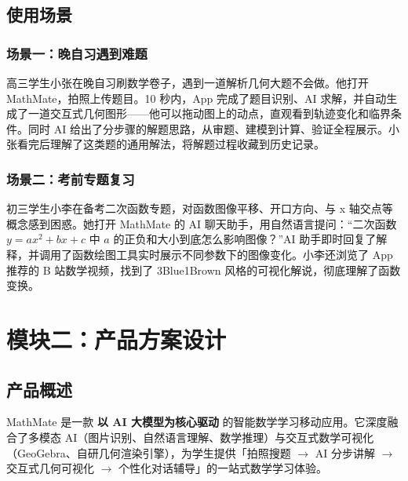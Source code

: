 \documentclass[12pt, a4paper]{ctexart}
\begin{document}
\subsection{使用场景}
\subsubsection{场景一：晚自习遇到难题}
高三学生小张在晚自习刷数学卷子，遇到一道解析几何大题不会做。他打开 MathMate，拍照上传题目。10 秒内，App 完成了题目识别、AI 求解，并自动生成了一道交互式几何图形——他可以拖动图上的动点，直观看到轨迹变化和临界条件。同时 AI 给出了分步骤的解题思路，从审题、建模到计算、验证全程展示。小张看完后理解了这类题的通用解法，将解题过程收藏到历史记录。

\subsubsection{场景二：考前专题复习}
初三学生小李在备考二次函数专题，对函数图像平移、开口方向、与 x 轴交点等概念感到困惑。她打开 MathMate 的 AI 聊天助手，用自然语言提问：“二次函数 $y=ax^2+bx+c$ 中 $a$ 的正负和大小到底怎么影响图像？”AI 助手即时回复了解释，并调用了函数绘图工具实时展示不同参数下的图像变化。小李还浏览了 App 推荐的 B 站数学视频，找到了 3Blue1Brown 风格的可视化解说，彻底理解了函数变换。

\section{模块二：产品方案设计}

\subsection{产品概述}
MathMate 是一款 \textbf{以 AI 大模型为核心驱动} 的智能数学学习移动应用。它深度融合了多模态 AI（图片识别、自然语言理解、数学推理）与交互式数学可视化（GeoGebra、自研几何渲染引擎），为学生提供「拍照搜题 $\rightarrow$ AI 分步讲解 $\rightarrow$ 交互式几何可视化 $\rightarrow$ 个性化对话辅导」的一站式数学学习体验。
\end{document}
